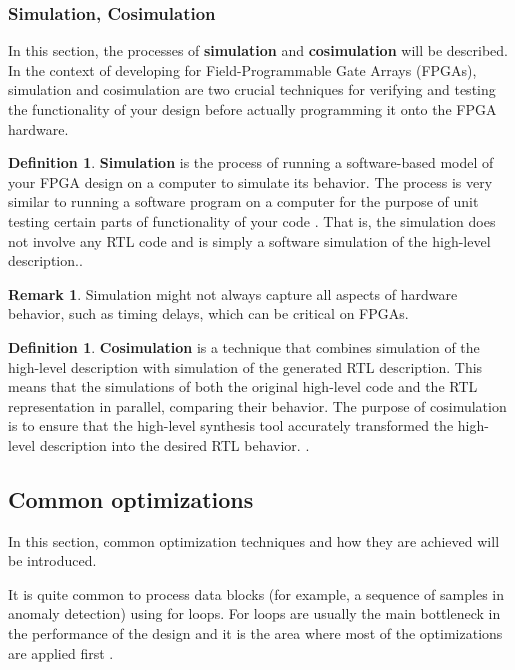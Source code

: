 \documentclass[a4paper, twoside]{report}
\theoremstyle{definition}
\newtheorem{definition}[theorem]{Definition}
\newtheorem{remark}[theorem]{Remark}
\numberwithin{equation}{section}
\begin{document}
\subsubsection{Simulation, Cosimulation}

In this section, the processes of \textbf{simulation} and \textbf{cosimulation} will be described.
In the context of developing for Field-Programmable Gate Arrays (FPGAs),
simulation and cosimulation are two crucial techniques for verifying and testing the
functionality of your design before actually programming it onto the FPGA hardware.

\begin{definition}
    \textbf{Simulation} is the process of running a software-based model of your FPGA design on
    a computer to simulate its behavior.
    The process is very similar to running a software program on a computer for
    the purpose of unit testing certain parts of functionality of your code
    \cite{AMD2023VitisSimCosim}. That is, the simulation does not
    involve any RTL code and is simply a software simulation of the high-level description..
\end{definition}

\begin{remark}
    Simulation might not always capture all aspects of hardware behavior, such as timing delays, which can be critical on FPGAs.
\end{remark}

\begin{definition}
    \textbf{Cosimulation} is a technique that combines simulation of the high-level description with simulation of the generated RTL description.
    This means that the simulations of both the original high-level code and the RTL representation in parallel, comparing their behavior.
    The purpose of cosimulation is to ensure that the high-level synthesis tool accurately transformed the high-level description into the desired RTL behavior.
    \cite{AMD2023VitisSimCosim}.
\end{definition}


\subsection{Common optimizations} \label{sec:common_optimizations}

In this section, common optimization techniques and how they are achieved will be introduced.

It is quite common to process data blocks
(for example, a sequence of samples in anomaly detection) using for loops.
For loops are usually the main bottleneck in the performance of the design
and it is the area where most of the optimizations are applied first \cite{AMD2023VitisHLS}.
\end{document}
